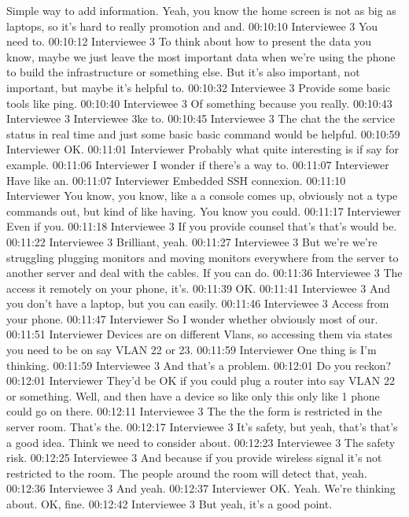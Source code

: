 Simple way to add information. Yeah, you know the home screen is not as big as laptops, so it's hard to really promotion and and.
00:10:10 Interviewee 3
You need to.
00:10:12 Interviewee 3
To think about how to present the data you know, maybe we just leave the most important data when we're using the phone to build the infrastructure or something else. But it's also important, not important, but maybe it's helpful to.
00:10:32 Interviewee 3
Provide some basic tools like ping.
00:10:40 Interviewee 3
Of something because you really.
00:10:43 Interviewee 3
Interviewee 3ke to.
00:10:45 Interviewee 3
The chat the the service status in real time and just some basic basic command would be helpful.
00:10:59 Interviewer
OK.
00:11:01 Interviewer
Probably what quite interesting is if say for example.
00:11:06 Interviewer
I wonder if there's a way to.
00:11:07 Interviewer
Have like an.
00:11:07 Interviewer
Embedded SSH connexion.
00:11:10 Interviewer
You know, you know, like a a console comes up, obviously not a type commands out, but kind of like having. You know you could.
00:11:17 Interviewer
Even if you.
00:11:18 Interviewee 3
If you provide counsel that's that's would be.
00:11:22 Interviewee 3
Brilliant, yeah.
00:11:27 Interviewee 3
But we're we're struggling plugging monitors and moving monitors everywhere from the server to another server and deal with the cables. If you can do.
00:11:36 Interviewee 3
The access it remotely on your phone, it's.
00:11:39
OK.
00:11:41 Interviewee 3
And you don't have a laptop, but you can easily.
00:11:46 Interviewee 3
Access from your phone.
00:11:47 Interviewer
So I wonder whether obviously most of our.
00:11:51 Interviewer
Devices are on different Vlans, so accessing them via states you need to be on say VLAN 22 or 23.
00:11:59 Interviewer
One thing is I'm thinking.
00:11:59 Interviewee 3
And that's a problem.
00:12:01
Do you reckon?
00:12:01 Interviewer
They'd be OK if you could plug a router into say VLAN 22 or something. Well, and then have a device so like only this only like 1 phone could go on there.
00:12:11 Interviewee 3
The the the form is restricted in the server room. That's the.
00:12:17 Interviewee 3
It's safety, but yeah, that's that's a good idea. Think we need to consider about.
00:12:23 Interviewee 3
The safety risk.
00:12:25 Interviewee 3
And because if you provide wireless signal it's not restricted to the room. The people around the room will detect that, yeah.
00:12:36 Interviewee 3
And yeah.
00:12:37 Interviewer
OK. Yeah. We're thinking about. OK, fine.
00:12:42 Interviewee 3
But yeah, it's a good point.
